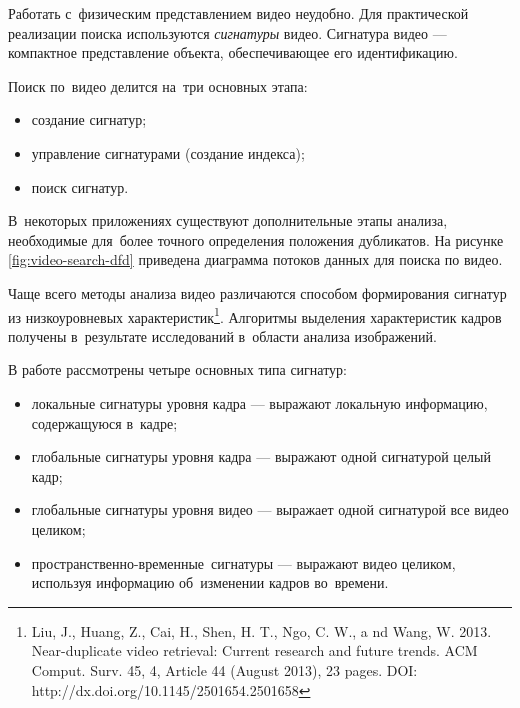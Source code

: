 \documentclass{.local/lib/classes/ndvr-super-article-standalone}
\begin{document}
    Работать с~физическим представлением видео неудобно.
    Для практической реализации поиска
    используются \textit{сигнатуры} видео. 
    Сигнатура видео — компактное представление объекта,
    обеспечивающее его идентификацию.

    \begin{minipage}{\textwidth}
        Поиск по~видео делится на~три основных этапа:
        \begin{itemize}
            \item создание сигнатур;
            \item управление сигнатурами (создание индекса);
            \item поиск сигнатур. 
        \end{itemize}
    \end{minipage}

    В~некоторых приложениях
    существуют дополнительные этапы анализа, 
    необходимые для~более
    точного определения положения дубликатов.
    На рисунке \ref{fig:video-search-dfd} приведена диаграмма
    потоков данных для поиска по видео.


    Чаще всего методы анализа видео различаются
    способом формирования сигнатур 
    из низкоуровневых характеристик\footnote{
        Liu, J., Huang, Z., Cai, H., Shen, H. T., Ngo, C. W., a
        nd Wang, W. 2013. Near-duplicate video retrieval:
        Current research and future trends. 
        ACM Comput. Surv. 45, 4, Article 44 (August 2013), 
        23 pages.
        DOI: http://dx.doi.org/10.1145/2501654.2501658
    }.
    Алгоритмы выделения характеристик кадров получены
    в~результате исследований 
    в~области анализа изображений.

    В работе рассмотрены четыре основных типа сигнатур: 
    \begin{itemize}%
        \item {
            локальные сигнатуры уровня кадра —
            выражают локальную информацию, 
            содержащуюся в~кадре;
        }
        \item {
            глобальные сигнатуры уровня кадра — 
            выражают одной сигнатурой целый кадр;
        }
        \item {
            глобальные сигнатуры уровня видео — 
            выражает одной сигнатурой все видео целиком;
        }
        \item {
            пространственно-временные~сигнатуры — 
            выражают видео целиком, 
            используя информацию 
            об~изменении кадров во~времени.
        }
    \end{itemize}
\end{document}
